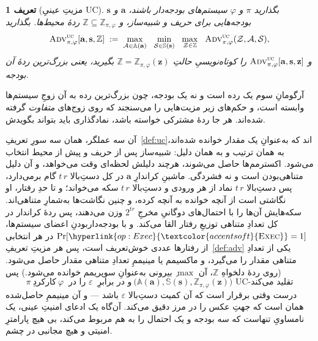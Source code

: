 \documentclass[10pt,oneside,openany]{book}
\newcommand{\Zenv}{\mathcal{Z}}
\newcommand{\Adv}{\mathcal{A}}
\newcommand{\Sim}{\mathcal{S}}
\newcommand{\bd}[1]{\mathbf{#1}}
\newcommand{\advtg}{\op{Adv}}
\newcommand{\Aset}{\mathbb{A}}
\newcommand{\SimSet}{\mathbb{S}}
\newcommand{\ZenvSet}{\mathbb{Z}}
\newcommand{\op}[1]{\textnormal{\textsc{#1}}}
\newcommand{\opl}[1]{\hyperlink{op:#1}{\textcolor{accentsoft}{\op{#1}}}}
\theoremstyle{accentdef}
\newtheorem{definition}{تعریف}[chapter]
\theoremstyle{accentplain}
\begin{document}
\begin{definition}[مزیتِ عینیِ UC]\label{def:concadv}
بگذارید $\pi$ و $\varphi$ سیستم‌های بودجه‌دار باشند، $\bd{a}$ و $\bd{s}$
بودجه‌هایی برای حریف و شبیه‌ساز، و $\ZenvSet \subseteq
\ZenvSet_{\pi,\varphi}$ ردهٔ محیط‌ها. بگذارید
\[
  \advtg^{\op{uc}}_{\pi,\varphi}[\bd{a},\bd{s},\ZenvSet]
  \;:=\;
  \max_{\Adv \in \Aset(\bd{a})} \ \
  \min_{\Sim \in \SimSet(\bd{s})} \ \
  \max_{\Zenv \in \ZenvSet} \ \
  \advtg^{\op{uc}}_{\pi,\varphi}(\Zenv,\Adv,\Sim) ,
\]
و $\advtg^{\op{uc}}_{\pi,\varphi}[\bd{a},\bd{s},\bd{z}]$ را کوتاه‌نویسیِ
حالتِ $\ZenvSet = \ZenvSet_{\pi,\varphi}(\bd{z})$ بگیرید، یعنی بزرگ‌ترین
ردهٔ آن بودجه.
\end{definition}

آرگومانِ سوم یک رده است و نه یک بودجه، چون بزرگ‌ترین رده به آن زوجِ
سیستم‌ها وابسته است، و حکم‌های زیر مزیت‌هایی را می‌سنجند که روی زوج‌های
\emph{متفاوت} گرفته شده‌اند. هر جا ردهٔ مشترکی خواسته باشد، نمادگذاری باید
بتواند بگویدش.

آن سه عملگر، همان سه سورِ تعریفِ~\ref{def:uc}اند که به‌عنوانِ یک مقدار
خوانده شده‌اند، به همان ترتیب و به همان دلیل: شبیه‌ساز پس از حریف و پیش از
محیط انتخاب می‌شود. اکسترمم‌ها حاصل می‌شوند، هرچند دلیلش لحظه‌ای وقت
می‌خواهد، و آن دلیل متناهی‌بودن است و نه فشردگی. ماشینِ کراندارِ $\bd{a}$
در کل دستِ‌بالا $t\,r$ گام برمی‌دارد، پس دستِ‌بالا $t\,r$ نماد از هر
ورودی و دستِ‌بالا $t\,r$ سکه می‌خواند؛ و تا حدِ رفتار، او نگاشتی است از
آنچه خوانده به آنچه کرده، و چنین نگاشت‌ها به‌شمارِ متناهی‌اند. سکه‌هایش
آن‌ها را با احتمال‌های دوگانیِ مخرجِ $2^{t r}$ وزن می‌دهند، پس ردهٔ کراندار
در کل تعدادِ متناهی توزیعِ رفتار القا می‌کند. و با بودجه‌دار‌بودنِ اعضای
سیستم‌ها، $\Pr[\opl{Exec} = 1]$ در هر انتخابی از رفتارها عددی خوش‌تعریف
است، پس هر مزیتِ تعریفِ~\ref{def:adv} یکی از تعدادِ متناهی مقدار را
می‌گیرد، و ماکسیمم یا مینیممِ تعدادِ متناهی مقدار حاصل می‌شود. (روی ردهٔ
دلخواهِ $\ZenvSet$، آن $\max$ِ بیرونی به‌عنوانِ سوپریمم خوانده می‌شود.) پس
\[
  \pi \ \text{کارکردِ} \ \varphi \ \text{ را در } \varepsilon \ \text{ و در برابرِ}
  \ \bigl(\Aset(\bd{a}),\SimSet(\bd{s}),\ZenvSet_{\pi,\varphi}(\bd{z})\bigr) \text{ UC-تقلید می‌کند}
\]
درست وقتی برقرار است که آن کمیت دستِ‌بالا $\varepsilon$ باشد --- و آن
مینیممِ حاصل‌شده همان است که جهتِ عکس را در مرز دقیق می‌کند. آن‌گاه یک
ادعای امنیتِ عینی، یک نامساویِ تنهاست که سه بودجه و یک احتمال را به هم
مربوط می‌کند، بی هیچ پارامترِ امنیتی و هیچ مجانبی در چشم.




\end{document}
